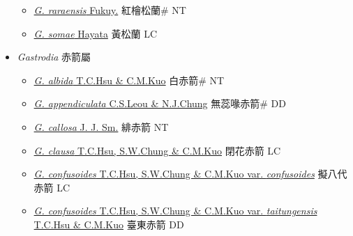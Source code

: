 \begin{itemize}
\begin{itemize}
        \item[] \href{http://www.theplantlist.org/tpl1.1/search?q=Gastrochilus+raraensis}{\textit{G. raraensis} Fukuy.}   紅檜松蘭\# NT
        \item[] \href{http://www.theplantlist.org/tpl1.1/search?q=Gastrochilus+somae}{\textit{G. somae} Hayata}     黃松蘭 LC
  \end{itemize}
 \item[] \textit{Gastrodia} 赤箭屬
                    
  \begin{itemize}
        \item[] \href{http://www.theplantlist.org/tpl1.1/search?q=Gastrodia+albida}{\textit{G. albida} T.C.Hsu \& C.M.Kuo}   白赤箭\# NT
        \item[] \href{http://www.theplantlist.org/tpl1.1/search?q=Gastrodia+appendiculata}{\textit{G. appendiculata} C.S.Leou \& N.J.Chung}   無蕊喙赤箭\# DD
        \item[] \href{http://www.theplantlist.org/tpl1.1/search?q=Gastrodia+callosa}{\textit{G. callosa} J. J. Sm.}   緋赤箭 NT
        \item[] \href{http://www.theplantlist.org/tpl1.1/search?q=Gastrodia+clausa}{\textit{G. clausa} T.C.Hsu, S.W.Chung \& C.M.Kuo}   閉花赤箭 LC
        \item[] \href{http://www.theplantlist.org/tpl1.1/search?q=Gastrodia+confusoides+var.+confusoides}{\textit{G. confusoides} T.C.Hsu, S.W.Chung \& C.M.Kuo var. \textit{confusoides}}   擬八代赤箭 LC
        \item[] \href{http://www.theplantlist.org/tpl1.1/search?q=Gastrodia+confusoides+var.+taitungensis}{\textit{G. confusoides} T.C.Hsu, S.W.Chung \& C.M.Kuo var. \textit{taitungensis} T.C.Hsu \& C.M.Kuo}   臺東赤箭 DD

\end{itemize}
\end{itemize}
